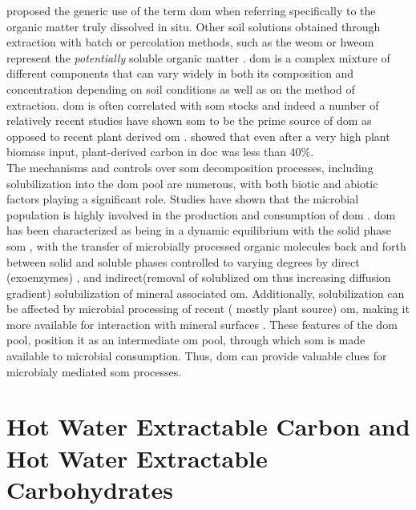 	\citet{zsolnay2003} proposed the generic use of the term \gls{dom} when referring specifically to the organic matter truly dissolved in situ. Other soil solutions obtained through extraction with batch or percolation methods, such as the \gls{weom} or \gls{hweom} represent the \textit{potentially} soluble organic matter \citep{marschner2003}. \gls{dom} is a complex mixture of different components that can vary widely in both its composition and concentration depending on soil conditions  as well as on the method of extraction\citep{bolan2011}. \gls{dom} is often  correlated with \gls{som} stocks and indeed a number of relatively recent studies have shown \gls{som} to be the prime source of \gls{dom} as opposed to  recent plant derived \gls{om} \citep{malik2013, kaiser2012}. \citet{malik2013}showed that  even after a very high plant biomass input, plant-derived carbon in \gls{doc} was less than 40\%.\\
	The mechanisms and controls over \gls{som} decomposition processes, including solubilization  into the \gls{dom} pool are numerous, with both biotic and abiotic factors playing a significant role\citep{kalbitz2000, bolan2011}. Studies have shown that the microbial population is highly involved in the production and consumption of \gls{dom} \citep{marschnerp2002, malik2013, guggenberger1998}.  \gls{dom} has been characterized as being in a dynamic equilibrium with the solid phase \gls{som} \citep{roth2019, kaiser2012},  with the transfer of microbially processed organic molecules back and forth between solid and soluble phases controlled to varying degrees by  direct (exoenzymes) \citep{guggenberger1998},  and indirect(removal of solublized \gls{om} thus increasing diffusion gradient) solubilization of mineral associated \gls{om}. Additionally, solubilization can be affected by microbial processing of recent ( mostly plant source) \gls{om}, making it more available for interaction with mineral surfaces \citep{kalbitz2003, kalbitz2008}. These features of the \gls{dom} pool, position it as an intermediate \gls{om} pool, through which \gls{som} is made available to microbial consumption. Thus, \gls{dom} can provide valuable clues for microbialy mediated \gls{som} processes. \\

\section{Hot Water Extractable Carbon and Hot Water Extractable Carbohydrates}

